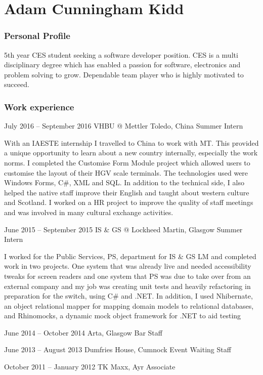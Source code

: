 \documentclass{tccv}
\begin{document}
\part{Adam Cunningham Kidd }

\section{Personal Profile}
5th year CES student seeking a software developer position. CES is a multi disciplinary degree which has enabled a passion for software, electronics and problem solving to grow. Dependable team player who is highly motivated to succeed. 

\section{Work experience}

\begin{eventlist}

\item{July 2016 -- September 2016}
     {VHBU @ Mettler Toledo, China}
     {Summer Intern}

With an IAESTE internship I travelled to China to work with MT. This provided a unique opportunity to learn about a new country internally, especially the work norms. I completed the Customise Form Module project which allowed users to customise the layout of their HGV scale terminals. The technologies used were Windows Forms, C\#, XML and SQL. In addition to the technical side, I also helped the native staff improve their English and taught about western culture and Scotland. I worked on a HR project to improve the quality of staff meetings and was involved in many cultural exchange activities.

\item{June 2015 -- September 2015}
     {IS \& GS @ Lockheed Martin, Glasgow}
     {Summer Intern}

I worked for the Public Services, PS, department for IS \& GS LM and completed work in two projects. One system that was already live and needed accessibility tweaks for screen readers and one system that PS was due to take over from an external company and my job was creating unit tests and heavily refactoring in preparation for the switch, using C\# and .NET. In addition, I used Nhibernate, an object relational mapper for mapping domain models to relational databases, and Rhinomocks, a dynamic mock object framework for .NET to aid testing

\item{June 2014 -- October 2014}
     {Arta, Glasgow}
     {Bar Staff}

\item{June 2013 -- August 2013}
     {Dumfries House, Cumnock}
     {Event Waiting Staff}
     
\pagebreak

\item{October 2011 -- January 2012}
     {TK Maxx, Ayr}
     {Associate}


\end{eventlist}
\end{document}
